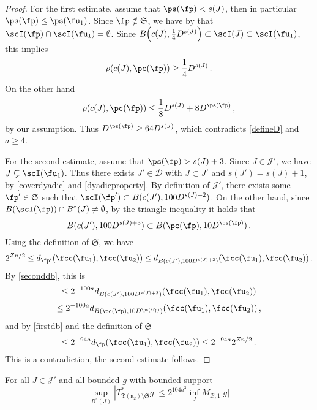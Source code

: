     \begin{proof}
        For the first estimate, assume that $\ps(\fp) < s(J)$, then in particular $\ps(\fp) \le \ps(\fu_1)$. Since $\fp \notin \mathfrak{S}$, we have by  that $\scI(\fp) \cap \scI(\fu_1) = \emptyset$.
        Since $B\Big(c(J), \frac{1}{4} D^{s(J)}\Big) \subset \scI(J) \subset \scI(\fu_1)$, this implies
        $$
            \rho(c(J), \pc(\fp)) \ge \frac{1}{4}D^{s(J)}\,.
        $$
        On the other hand
        $$
            \rho(c(J), \pc(\fp)) \le \frac{1}{8} D^{s(J)} + 8 D^{\ps(\fp)}\,,
        $$
        by our assumption. Thus $D^{\ps(\fp)} \ge 64 D^{s(J)}$, which contradicts \eqref{defineD} and $a \ge 4$.

        For the second estimate, assume that $\ps(\fp) > s(J) + 3$. Since $J \in \mathcal{J}'$, we have $J \subsetneq \scI(\fu_1)$. Thus there exists $J' \in \mathcal{D}$ with $J \subset J'$ and $s(J') = s(J) + 1$, by \eqref{coverdyadic} and \eqref{dyadicproperty}. By definition of $\mathcal{J}'$, there exists some $\fp' \in \mathfrak{S}$ such that $\scI(\fp') \subset B(c(J'), 100 D^{s(J) + 2})$. On the other hand, since $B(\scI(\fp)) \cap B^\circ(J) \ne \emptyset$, by the triangle inequality it holds that
        $$
            B(c(J'), 100 D^{s(J) + 3}) \subset B(\pc(\fp), 10 D^{\ps(\fp)})\,.
        $$
        Using the definition of $\mathfrak{S}$, we have
        $$
            2^{Zn/2} \le d_{\fp'}(\fcc(\fu_1), \fcc(\fu_2)) \le d_{B(c(J'), 100 D^{s(J) + 2})}(\fcc(\fu_1), \fcc(\fu_2))\,.
        $$
        By \eqref{seconddb}, this is
        $$
            \le 2^{-100a} d_{B(c(J'), 100 D^{s(J) + 3})}(\fcc(\fu_1), \fcc(\fu_2))
        $$
        $$
            \le 2^{-100a} d_{B(\pc(\fp), 10 D^{\ps(\fp)})}(\fcc(\fu_1), \fcc(\fu_2))\,,
        $$
        and by \eqref{firstdb} and the definition of $\mathfrak{S}$
        $$
            \le 2^{-94a} d_{\fp}(\fcc(\fu_1), \fcc(\fu_2)) \le 2^{-94a} 2^{Zn/2}\,.
        $$
        This is a contradiction, the second estimate follows.
    \end{proof}


    \begin{lemma}
        \label{local-tree-control}
        For all $J \in \mathcal{J}'$ and all bounded $g$ with bounded support
        $$
            \sup_{B^\circ{}(J)} |T_{\mathfrak{T}(\mathfrak{u}_2)\setminus\mathfrak{S}}^* g| \le 2^{104a^3} \inf_J M_{\mathcal{B},1}|g|
        $$
    \end{lemma}

